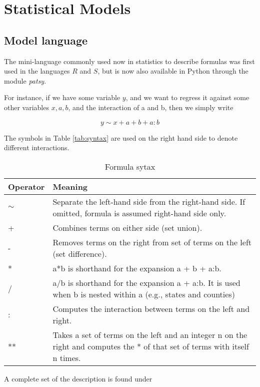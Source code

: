 \chapter{ Statistical Models } 

\section{Model language}
The mini-language commonly used now in statistics to describe formulas was first used in the languages $R$ and $S$, but is now also available in Python through the module \emph{patsy}.

For instance, if we have some variable $y$, and we want to regress it against some other variables $x, a, b$, and the interaction of a and b, then we simply write

\begin{equation}
    y \sim x + a + b + a:b
\end{equation}

The symbols in Table \ref{tab:syntax} are used on the right hand side to denote different interactions.

\begin{table}
  \centering
  \footnotesize{
  \begin{tabular}{ p{2cm} p{9cm} }
     Operator & Meaning \\
     \hline
    $\sim $ &	Separate the left-hand side from the right-hand side. If omitted, formula is assumed right-hand side only. \\
    + &	Combines terms on either side (set union). \\
    - &	Removes terms on the right from set of terms on the left (set difference). \\
    * &	a*b is shorthand for the expansion a + b + a:b. \\
    / &	a/b is shorthand for the expansion a + a:b. It is used when b is nested within a (e.g., states and counties) \\
    : &	Computes the interaction between terms on the left and right. \\
    ** & Takes a set of terms on the left and an integer n on the right and computes the * of that set of terms with itself n times.\\
     \hline
  \end{tabular}
  }
  \caption{Formula sytax}
\end{table}\label{tab:syntax}

A complete set of the description is found under \cite{patsy}

